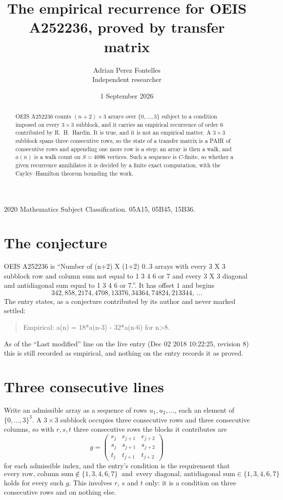 \documentclass[11pt,a4paper]{article}
\title{The empirical recurrence for OEIS A252236, proved by transfer matrix}
\author{Adrian Perez Fontelles\\ \small Independent researcher}
\date{1 September 2026}
\theoremstyle{plain}
\theoremstyle{definition}
\begin{document}
\maketitle

\begin{abstract}
OEIS A252236 counts $(n+2)\times3$ arrays over $\{0,\dots,3\}$ subject to a condition imposed on
every $3\times3$ subblock, and it carries an empirical recurrence of order $6$
contributed by R.~H.~Hardin. It is true, and it is not an empirical matter. A $3\times3$
subblock spans three consecutive rows, so the state of a transfer matrix is a PAIR of
consecutive rows and appending one more row is a step; an array is then a walk, and
$a(n)$ is a walk count on $S=4096$ vertices. Such a sequence is $C$-finite, so whether a given
recurrence annihilates it is decided by a finite exact computation, with the Cayley--Hamilton
theorem bounding the work.
\end{abstract}

\noindent\small 2020 Mathematics Subject Classification. 05A15, 05B45, 15B36.\normalsize

\section{The conjecture}

OEIS A252236 is ``Number of (n+2) X (1+2) 0..3 arrays with every 3 X 3 subblock row and column sum not equal to 1 3 4 6 or 7 and every 3 X 3 diagonal and antidiagonal sum equal to 1 3 4 6 or 7.''. It has offset $1$ and begins
\[
342, 858, 2174, 4708, 13376, 34364, 74824, 213344,\ \dots
\]
The entry states, as a conjecture contributed by its author and never marked settled:
\begin{quote}
Empirical: a(n) = 18*a(n-3) - 32*a(n-6) for n>8.
\end{quote}
As of the ``Last modified'' line on the live entry (Dec 02 2018 10:22:25, revision 8) this is still
recorded as empirical, and nothing on the entry records it as proved.

\section{Three consecutive lines}

Write an admissible array as a sequence of rows $u_1,u_2,\dots$, each an element of
$\{0,\dots,3\}^{3}$. A $3\times3$ subblock occupies three consecutive rows and
three consecutive columns, so with $r,s,t$ three consecutive rows the blocks it
contributes are
\[
g=\begin{pmatrix}r_j&r_{j+1}&r_{j+2}\\ s_j&s_{j+1}&s_{j+2}\\ t_j&t_{j+1}&t_{j+2}\end{pmatrix}
\]
for each admissible index, and the entry's condition is the requirement that
\[
\text{every row, column sum} \notin \{1,3,4,6,7\}\ \text{ and }\ \text{every diagonal, antidiagonal sum} \in \{1,3,4,6,7\}
\]
holds for every such $g$. This involves $r$, $s$ and $t$ only: it is a condition on
three consecutive rows and on nothing else.
\end{document}
